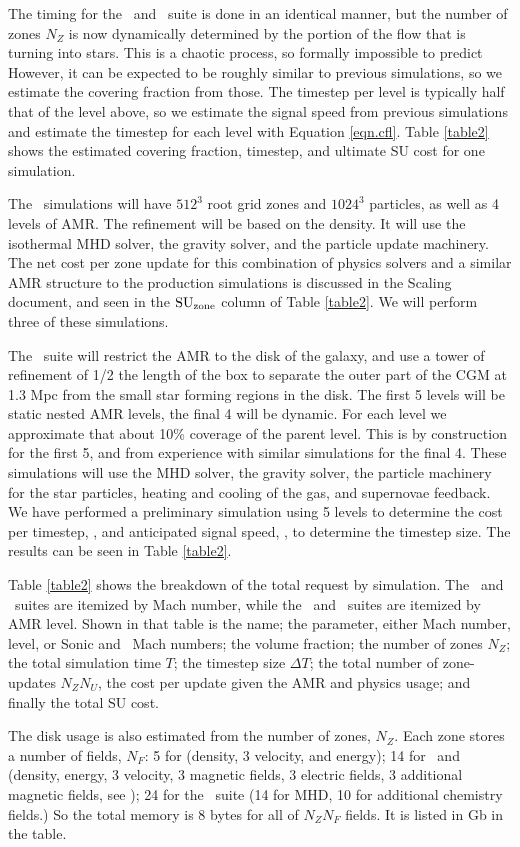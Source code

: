 The timing for the \nameCores\ and \nameGalaxies\ suite is done in an identical manner, but the
number of zones $N_Z$ is now dynamically determined by the portion of the flow
that is turning into stars.  This is a chaotic process, so formally impossible
to predict
However, it can be expected to be roughly similar to
previous simulations, so we estimate the covering fraction from those.   The timestep per level is typically half that of the level
above, so we estimate the signal speed from previous simulations and estimate
the timestep for each level with Equation \ref{eqn.cfl}.  Table \ref{table2}
shows the estimated covering fraction, timestep, and ultimate SU cost for one
simulation.  

The \nameCores\ simulations will have $512^3$ root grid zones and $1024^3$
particles, as well as 4 levels of AMR.  The refinement will be based on the
density.  It will use the isothermal MHD solver, the gravity solver, and the
particle update machinery.  The net cost per zone update for this combination of
physics solvers and a similar AMR structure to the production simulations is
discussed in the Scaling document, and seen in the $\rm{SU}_{\rm{zone}}$ column of Table
\ref{table2}.  We will perform three of these simulations.

The \nameGalaxies\ suite will restrict the AMR to the disk of the galaxy, and
use a tower of refinement of 1/2 the length of the box to separate the outer
part of the CGM at 1.3 Mpc from the small star forming regions in the disk.  The
first 5 levels will be static nested AMR levels, the final 4 will be dynamic.
For each level we approximate that about 10\% coverage of the parent level.
This is by construction for the first 5, and from experience with similar
simulations for the final 4.  These simulations will use the MHD solver, the
gravity solver, the particle machinery for the star particles, heating and
cooling of the gas, and supernovae feedback.  We have performed a preliminary
simulation using 5 levels to determine the cost per timestep, \suzu, and
anticipated signal speed, \vsignal, to determine the timestep size. The results
can be seen in Table \ref{table2}. 

Table \ref{table2} shows the breakdown of the total request by simulation.  The
\nameTurbulence\ and \nameCMB\ suites are itemized by Mach number, while the
\nameCores\ and \nameGalaxies\ suites are itemized by AMR level.  Shown in that
table is the name; the parameter, either Mach number, level, or Sonic and \alf\
Mach numbers;  the volume fraction; the number of zones $N_Z$; the total
simulation time $T$; the timestep size $\Delta T$; the total number of
zone-updates $N_Z N_U$, the cost per update given the AMR and physics usage; and
finally the total SU cost.

The disk usage is also estimated from the number of zones, $N_Z$.  Each zone
stores a number of fields, $N_F$: 5 for \nameTurbulence (density, 3 velocity, and
energy); 14 for \nameCores\ and
\nameCMB (density, energy, 3 velocity, 3 magnetic fields, 3 electric fields, 3
additional magnetic fields, see \citet{Collins10}); 24 for the \nameGalaxies\
suite (14 for MHD, 10 for additional chemistry fields.)  So the total memory is
8 bytes for all of $N_Z N_F$ fields.  It is listed in Gb in the table.


